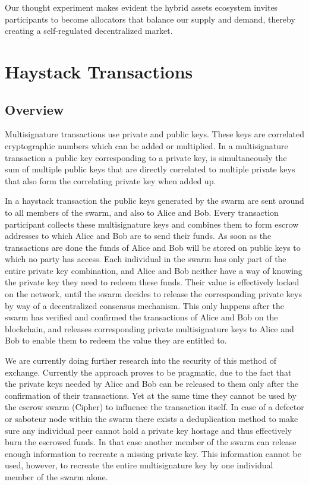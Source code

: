 \documentclass[a4paper,fullpack]{article}
\begin{document}
Our thought experiment makes evident the hybrid assets ecosystem invites participants to become allocators that balance our supply and demand, thereby creating a self-regulated decentralized market.


\section{Haystack Transactions}

\subsection{Overview}

Multisignature transactions use private and public keys. These keys are correlated cryptographic numbers which can be added or multiplied. In a multisignature transaction a public key corresponding to a private key, is simultaneously the sum of multiple public keys that are directly correlated to multiple private keys that also form the correlating private key when added up.

In a haystack transaction the public keys generated by the swarm are sent around to all members of the swarm, and also to Alice and Bob. Every transaction participant collects these multisignature keys and combines them to form escrow addresses to which Alice and Bob are to send their funds. As soon as the transactions are done the funds of Alice and Bob will be stored on public keys to which no party has access. Each individual in the swarm has only part of the entire private key combination, and Alice and Bob neither have a way of knowing the private key they need to redeem these funds. Their value is effectively locked on the network, until the swarm decides to release the corresponding private keys by way of a decentralized consensus mechanism. This only happens after the swarm has verified and confirmed the transactions of Alice and Bob on the blockchain, and releases corresponding private multisignature keys to Alice and Bob to enable them to redeem the value they are entitled to.

We are currently doing further research into the security of this method of exchange. Currently the approach proves to be pragmatic, due to the fact that the private keys needed by Alice and Bob can be released to them only after the confirmation of their transactions. Yet at the same time they cannot be used by the escrow swarm (Cipher) to influence the transaction itself. In case of a defector or saboteur node within the swarm there exists a deduplication method to make sure any individual peer cannot hold a private key hostage and thus effectively burn the escrowed funds. In that case another member of the swarm can release enough information to recreate a missing private key. This information cannot be used, however, to recreate the entire multisignature key by one individual member of the swarm alone.
\end{document}
